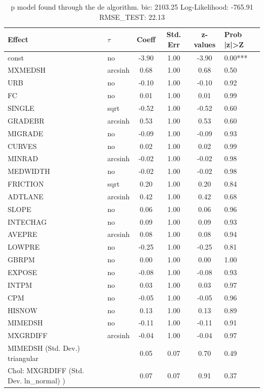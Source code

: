 \begin{table}
	\caption{p model found through the de algorithm. bic: 2103.25 Log-Likelihood: -765.91 RMSE_TEST: 22.13}
	\begin{center}
		\begin{tabular}{|l|l|c|c|c|l|}
			\hline
			Effect & $\tau$ & Coeff & Std. Err & z-values & Prob |z|>Z \\
			\hline
			const & no & -3.90 & 1.00 & -3.90 & 0.00*** \\
			\hline
			MXMEDSH & arcsinh & 0.68 & 1.00 & 0.68 & 0.50 \\
			\hline
			URB & no & -0.10 & 1.00 & -0.10 & 0.92 \\
			\hline
			FC & no & 0.01 & 1.00 & 0.01 & 0.99 \\
			\hline
			SINGLE & sqrt & -0.52 & 1.00 & -0.52 & 0.60 \\
			\hline
			GRADEBR & arcsinh & 0.53 & 1.00 & 0.53 & 0.60 \\
			\hline
			MIGRADE & no & -0.09 & 1.00 & -0.09 & 0.93 \\
			\hline
			CURVES & no & 0.02 & 1.00 & 0.02 & 0.99 \\
			\hline
			MINRAD & arcsinh & -0.02 & 1.00 & -0.02 & 0.98 \\
			\hline
			MEDWIDTH & no & -0.02 & 1.00 & -0.02 & 0.98 \\
			\hline
			FRICTION & sqrt & 0.20 & 1.00 & 0.20 & 0.84 \\
			\hline
			ADTLANE & arcsinh & 0.42 & 1.00 & 0.42 & 0.68 \\
			\hline
			SLOPE & no & 0.06 & 1.00 & 0.06 & 0.96 \\
			\hline
			INTECHAG & no & 0.09 & 1.00 & 0.09 & 0.93 \\
			\hline
			AVEPRE & arcsinh & 0.08 & 1.00 & 0.08 & 0.94 \\
			\hline
			LOWPRE & no & -0.25 & 1.00 & -0.25 & 0.81 \\
			\hline
			GBRPM & no & 0.00 & 1.00 & 0.00 & 1.00 \\
			\hline
			EXPOSE & no & -0.08 & 1.00 & -0.08 & 0.93 \\
			\hline
			INTPM & no & 0.03 & 1.00 & 0.03 & 0.97 \\
			\hline
			CPM & no & -0.05 & 1.00 & -0.05 & 0.96 \\
			\hline
			HISNOW & no & 0.13 & 1.00 & 0.13 & 0.89 \\
			\hline
			MIMEDSH & no & -0.11 & 1.00 & -0.11 & 0.91 \\
			\hline
			MXGRDIFF & arcsinh & -0.04 & 1.00 & -0.04 & 0.97 \\
			\hline
			MIMEDSH (Std. Dev.) triangular &  & 0.05 & 0.07 & 0.70 & 0.49 \\
			\hline
			 Chol: MXGRDIFF (Std. Dev. ln_normal) ) &  & 0.07 & 0.07 & 0.91 & 0.37 \\
			\hline
		\end{tabular}
	\end{center}
\end{table}